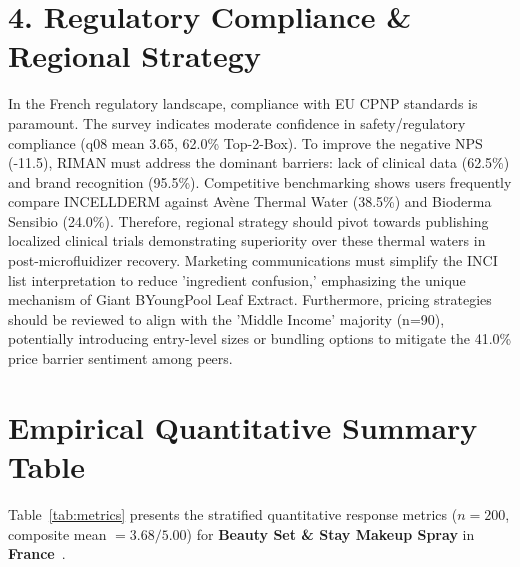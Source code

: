 \documentclass[10pt,twocolumn,a4paper]{article}
\begin{document}
\section{4. Regulatory Compliance \& Regional Strategy}
In the French regulatory landscape, compliance with EU CPNP standards is paramount. The survey indicates moderate confidence in safety/regulatory compliance (q08 mean 3.65, 62.0\% Top-2-Box). To improve the negative NPS (-11.5), RIMAN must address the dominant barriers: lack of clinical data (62.5\%) and brand recognition (95.5\%). Competitive benchmarking shows users frequently compare INCELLDERM against Avène Thermal Water (38.5\%) and Bioderma Sensibio (24.0\%). Therefore, regional strategy should pivot towards publishing localized clinical trials demonstrating superiority over these thermal waters in post-microfluidizer recovery. Marketing communications must simplify the INCI list interpretation to reduce 'ingredient confusion,' emphasizing the unique mechanism of Giant BYoungPool Leaf Extract. Furthermore, pricing strategies should be reviewed to align with the 'Middle Income' majority (n=90), potentially introducing entry-level sizes or bundling options to mitigate the 41.0\% price barrier sentiment among peers.


\section{Empirical Quantitative Summary Table}
Table~\ref{tab:metrics} presents the stratified quantitative response metrics ($n = 200$, composite mean $= 3.68/5.00$) for \textbf{Beauty Set \& Stay Makeup Spray} in \textbf{France}~\cite{ref_kaggle_doi,ref_hf_doi}.
\end{document}
